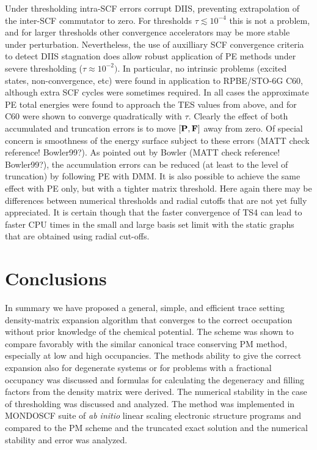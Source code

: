 \commentoutA{\documentclass[prb,aps,twocolumn,twocolumngrid,secnumarabic,superbib,hyperref]{revtex4}}
\begin{document}
{Under thresholding intra-SCF errors corrupt DIIS, preventing 
extrapolation of the inter-SCF commutator to zero.  For thresholds $\tau \lesssim 10^{-4}$
this is not a problem, and for larger thresholds other convergence 
accelerators may be more stable under perturbation.  Nevertheless,
the use of auxilliary SCF convergence criteria 
to detect DIIS stagnation does allow robust application of PE methods
under severe thresholding ($\tau \approx 10^{-2})$.
In particular, no intrinsic problems (excited states, non-convergence, etc) were
found in application to RPBE/STO-6G C60, although extra SCF cycles were sometimes required. 
In all cases the approximate PE total energies were found to approach the TES values
from above, and for C60 were shown to converge quadratically with $\tau$.
Clearly the effect of both accumulated and truncation errors is to move 
$[\bf P,F]$ away from zero.  Of special concern is smoothness
of the energy surface subject to these errors \cite{DBowler00} (MATT check reference! Bowler99?).  As pointed out by 
Bowler \cite{DBowler00} (MATT check reference! Bowler99?),  the accumulation errors can be reduced 
(at least to the level of truncation) by following PE with DMM. 
It is also possible to achieve the same effect with PE only, but with a tighter matrix threshold.  
Here again there may be differences between numerical thresholds and radial cutoffs 
that are not yet fully appreciated. It is certain though that the faster convergence of TS4 can 
lead to faster CPU times in the small and large basis set limit with the static graphs 
that are obtained using radial cut-offs.  

\section{Conclusions}

In summary we have proposed a general, simple, and efficient 
trace setting density-matrix expansion algorithm that converges 
to the correct occupation without prior knowledge of the chemical
potential. The scheme was shown to compare favorably with the
similar canonical trace conserving PM method, especially at
low and high occupancies. The methods ability to give the
correct expansion also for degenerate systems or for problems
with a fractional occupancy was discussed
and formulas for calculating the degeneracy and filling factors
from the density matrix were derived. 
The numerical stability in the case of thresholding
was discussed and analyzed. The method was implemented in
MONDOSCF suite of {\it ab initio} linear scaling electronic structure
programs and compared to the PM scheme and the
truncated exact solution and the numerical stability
and error was analyzed.

}
\end{document}
